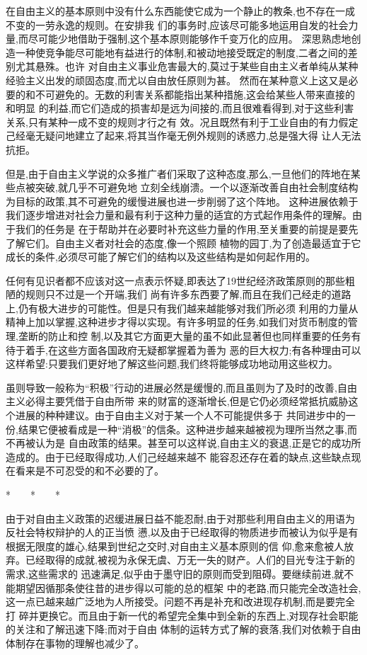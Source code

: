 ﻿\documentclass[12pt]{article}
\begin{document}
在自由主义的基本原则中没有什么东西能使它成为一个静止的教条,也不存在一成不变的一劳永逸的规则。在安排我
们的事务时,应该尽可能多地运用自发的社会力量,而尽可能少地借助于强制,这个基本原则能够作千变万化的应用。
深思熟虑地创造一种使竞争能尽可能地有益进行的体制,和被动地接受既定的制度,二者之间的差别尤其悬殊。也许
对自由主义事业危害最大的,莫过于某些自由主义者单纯从某种经验主义出发的顽固态度,而尤以自由放任原则为甚。
然而在某种意义上这又是必要的和不可避免的。无数的利害关系都能指出某种措施,这会给某些人带来直接的和明显
的利益,而它们造成的损害却是远为间接的,而且很难看得到,对于这些利害关系,只有某种一成不变的规则才行之有
效。况且既然有利于工业自由的有力假定己经毫无疑问地建立了起来,将其当作毫无例外规则的诱惑力,总是强大得
让人无法抗拒。

但是,由于自由主义学说的众多推广者们采取了这种态度,那么,一旦他们的阵地在某些点被突破,就几乎不可避免地
立刻全线崩溃。一个以逐渐改善自由社会制度结构为目标的政策,其不可避免的缓慢进展也进一步削弱了这个阵地。
这种进展依赖于我们逐步增进对社会力量和最有利于这种力量的适宜的方式起作用条件的理解。由于我们的任务是
在于帮助并在必要时补充这些力量的作用,至关重要的前提是要先了解它们。自由主义者对社会的态度,像一个照顾
植物的园丁,为了创造最适宜于它成长的条件,必须尽可能了解它们的结构以及这些结构是如何起作用的。

任何有见识者都不应该对这一点表示怀疑,即表达了19世纪经济政策原则的那些粗陋的规则只不过是一个开端,我们
尚有许多东西要了解,而且在我们己经走的道路上,仍有极大进步的可能性。但是只有我们越来越能够对我们所必须
利用的力量从精神上加以掌握,这种进步才得以实现。有许多明显的任务,如我们对货币制度的管理,垄断的防止和控
制,以及其它方面更大量的虽不如此显著但也同样重要的任务有待于着手,在这些方面各国政府无疑都掌握着为善为
恶的巨大权力;有各种理由可以这样希望:只要我们更好地了解这些问题,我们终将能够成功地动用这些权力。

虽则导致一般称为``积极''行动的进展必然是缓慢的,而且虽则为了及时的改善,自由主义必得主要凭借于自由所带
来的财富的逐渐增长,但是它仍必须经常抵抗威胁这个进展的种种建议。由于自由主义对于某一个人不可能提供多于
共同进步中的一份,结果它便被看成是一种``消极''的信条。这种进步越来越被视为理所当然之事,而不再被认为是
自由政策的结果。甚至可以这样说,自由主义的衰退,正是它的成功所造成的。由于已经取得成功,人们己经越来越不
能容忍还存在着的缺点,这些缺点现在看来是不可忍受的和不必要的了。

*　　*　　*

由于对自由主义政策的迟缓进展日益不能忍耐,由于对那些利用自由主义的用语为反社会特权辩护的人的正当愤
懑,以及由于已经取得的物质进步而被认为似乎是有根据无限度的雄心,结果到世纪之交时,对自由主义基本原则的信
仰,愈来愈被人放弃。已经取得的成就,被视为永保无虞、万无一失的财产。人们的目光专注于新的需求,这些需求的
迅速满足,似乎由于墨守旧的原则而受到阻碍。要继续前进,就不能期望因循那条使往昔的进步得以可能的总的框架
中的老路,而只能完全改造社会,这一点已越来越广泛地为人所接受。问题不再是补充和改进现存机制,而是要完全打
碎并更换它。而且由于新一代的希望完全集中到全新的东西上,对现存社会职能的关注和了解迅速下降;而对于自由
体制的运转方式了解的衰落,我们对依赖于自由体制存在事物的理解也减少了。
\end{document}
